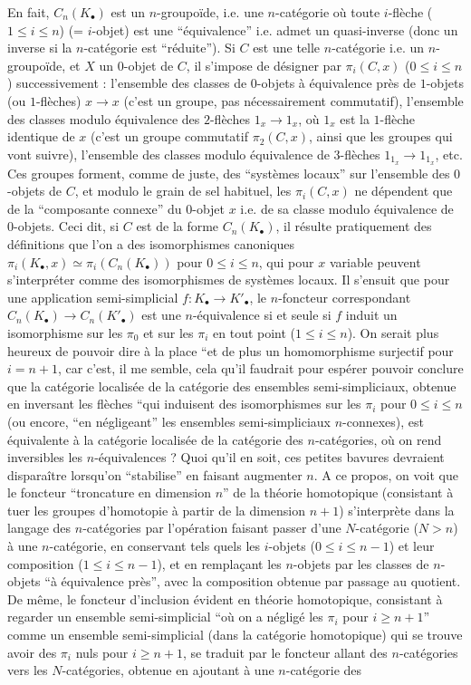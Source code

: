 En fait, $C_n(K_{\bullet})$ est un $n$-groupoïde, i.e. une $n$-catégorie où toute $i$-flèche ($1 \leq i \leq n$) (= $i$-objet) est une ``équivalence'' i.e. admet un quasi-inverse (donc un inverse si la $n$-catégorie est ``réduite''). Si $C$ est une telle $n$-catégorie i.e. un $n$-groupoïde, et $X$ un $0$-objet de $C$, il s'impose de désigner par $\pi_i(C, x)$ ($0 \leq i \leq n$) successivement : l'ensemble des classes de $0$-objets à équivalence près de $1$-objets (ou $1$-flèches) $x \to x$ (c'est un groupe, pas nécessairement commutatif), l'ensemble des classes modulo équivalence des $2$-flèches $1_x \to 1_x$, où $1_x$ est la $1$-flèche identique de $x$ (c'est un groupe commutatif $\pi_2(C, x)$, ainsi que les groupes qui vont suivre), l'ensemble des classes modulo équivalence de $3$-flèches $1_{1_x} \to 1_{1_x}$, etc. Ces groupes forment, comme de juste, des ``systèmes locaux'' sur l'ensemble des $0$-objets de $C$, et modulo le grain de sel habituel, les $\pi_i(C, x)$ ne dépendent que de la ``composante connexe'' du $0$-objet $x$ i.e. de sa classe modulo équivalence de $0$-objets. Ceci dit, si $C$ est de la forme $C_n(K_{\bullet})$, il résulte pratiquement des définitions que l'on a des isomorphismes canoniques $\pi_i(K_{\bullet}, x) \simeq \pi_i(C_n(K_{\bullet}))$ pour $0 \leq i \leq n$, qui pour $x$ variable peuvent s'interpréter comme des isomorphismes de systèmes locaux. Il s'ensuit que pour une application semi-simplicial $f: K_{\bullet} \to K'_{\bullet}$, le $n$-foncteur correspondant $C_n(K_{\bullet}) \to C_n(K'_{\bullet})$ est une $n$-équivalence si et seule si $f$ induit un isomorphisme sur les $\pi_0$ et sur les $\pi_i$ en tout point ($1 \leq i \leq n$). On serait plus heureux de pouvoir dire à la place ``et de plus un homomorphisme surjectif pour $i = n + 1$, car c'est, il me semble, cela qu'il faudrait pour espérer pouvoir conclure que la catégorie localisée de la catégorie des ensembles semi-simpliciaux, obtenue en inversant les flèches ``qui induisent des isomorphismes sur les $\pi_i$ pour $0 \leq i \leq n$ (ou encore, ``en négligeant'' les ensembles semi-simpliciaux $n$-connexes), est équivalente à la catégorie localisée de la catégorie des $n$-catégories, où on rend inversibles les $n$-équivalences ? Quoi qu'il en soit, ces petites bavures devraient disparaître lorsqu'on ``stabilise'' en faisant augmenter $n$. A ce propos, on voit que le foncteur ``troncature en dimension $n$'' de la théorie homotopique (consistant à tuer les groupes d'homotopie à partir de la dimension $n + 1$) s'interprète dans la langage des $n$-catégories par l'opération faisant passer d'une $N$-catégorie ($N > n$) à une $n$-catégorie, en conservant tels quels les $i$-objets ($0 \leq i \leq n-1$) et leur composition ($1 \leq i \leq n-1$), et en rempla\c{c}ant les $n$-objets par les classes de $n$-objets ``à équivalence près'', avec la composition obtenue par passage au quotient. De même, le foncteur d'inclusion évident en théorie homotopique, consistant à regarder un ensemble semi-simplicial ``où on a négligé les $\pi_i$ pour $i \geq n + 1$'' comme un ensemble semi-simplicial (dans la catégorie homotopique) qui se trouve avoir des $\pi_i$ nuls pour $i \geq n + 1$, se traduit par le foncteur allant des $n$-catégories vers les $N$-catégories, obtenue en ajoutant à une $n$-catégorie des 